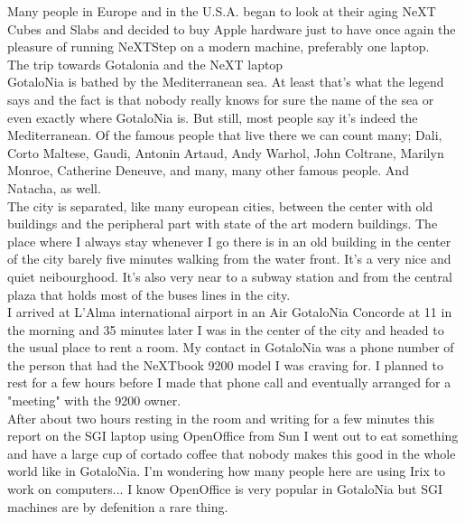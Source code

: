 \documentclass[11pt,twoside,a4paper]{book}
\begin{document}
\begin{multicols*}{2}
Many people in Europe and in the U.S.A. began to look at their aging NeXT Cubes and Slabs and decided to buy Apple hardware just to have once again the pleasure of running NeXTStep on a modern machine, preferably one laptop. ~\\

{\large The trip towards Gotalonia and the NeXT laptop} ~\\

GotaloNia is bathed by the Mediterranean sea. At least that's what the legend says and the fact is that nobody really knows for sure the name of the sea or even exactly where GotaloNia is. But still, most people say it's indeed the Mediterranean. Of the famous people that live there we can count many; Dali, Corto Maltese, Gaudi, Antonin Artaud, Andy Warhol, John Coltrane, Marilyn Monroe, Catherine Deneuve, and many, many other famous people. And Natacha, as well. ~\\

The city is separated, like many european cities, between the center with old buildings and the peripheral part with state of the art modern buildings. The place where I always stay whenever I go there is in an old building in the center of the city barely five minutes walking from the water front. It's a very nice and quiet neibourghood. It's also very near to a subway station and from the central plaza that holds most of the buses lines in the city. ~\\

I arrived at L'Alma international airport in an Air GotaloNia Concorde at 11 in the morning and 35 minutes later I was in the center of the city and headed to the usual place to rent a room. My contact in GotaloNia was a phone number of the person that had the NeXTbook 9200 model I was craving for. I planned to rest for a few hours before I made that phone call and eventually arranged for a "meeting" with the 9200 owner. ~\\

After about two hours resting in the room and writing for a few minutes this report on the SGI laptop using OpenOffice from Sun I went out to eat something and have a large cup of cortado coffee that nobody makes this good in the whole world like in GotaloNia. I'm wondering how many people here are using Irix to work on computers... I know OpenOffice is very popular in GotaloNia but SGI machines are by defenition a rare thing. ~\\


\end{multicols*}
\end{document}
